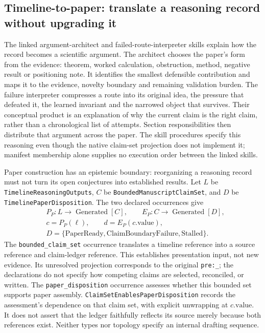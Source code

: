 

\subsection{Timeline-to-paper: translate a reasoning record without upgrading it}
\label{app:granular-timeline-paper-independent-workflow}
The linked argument-architect and failed-route-interpreter skills explain how
the record becomes a scientific argument. The architect chooses the paper's form
from the evidence: theorem, worked calculation, obstruction, method, negative
result or positioning note. It identifies the smallest defensible contribution
and maps it to the evidence, novelty boundary and remaining validation burden.
The failure interpreter compresses a route into its original idea, the pressure
that defeated it, the learned invariant and the narrowed object that survives.
Their conceptual product is an explanation of why the current claim is the right
claim, rather than a chronological list of attempts. Section responsibilities
then distribute that argument across the paper. The skill procedures specify this
reasoning even though the native claim-set projection does not implement it;
manifest membership alone supplies no execution order between the linked skills.

Paper construction has an epistemic boundary: reorganizing a reasoning record
must not turn its open conjectures into established results. Let $L$ be
\texttt{Timeline\allowbreak Reasoning\allowbreak Outputs}, $C$ be
\texttt{Bounded\allowbreak Manuscript\allowbreak Claim\allowbreak Set}, and $D$ be
\texttt{Timeline\allowbreak Paper\allowbreak Disposition}. The two declared occurrences give
\[
\begin{aligned}
&P_P:L\to\operatorname{Generated}[C],\qquad
 E_P:C\to\operatorname{Generated}[D],\\
&c=P_P(\ell),\qquad d=E_P(c.\mathrm{value}),\\
&D=\{\mathrm{PaperReady},\mathrm{ClaimBoundaryFailure},\mathrm{Stalled}\}.
\end{aligned}
\]
The \texttt{bounded\_\allowbreak claim\_\allowbreak set} occurrence translates a timeline reference into
a source reference and claim-ledger reference. This establishes presentation
input, not new evidence. Its unresolved projection corresponds to the original
\texttt{pre:\_\allowbreak }; the declarations do not specify how competing claims are
selected, reconciled, or written. The \texttt{paper\_\allowbreak disposition} occurrence
assesses whether this bounded set supports paper assembly.
\texttt{Claim\allowbreak Set\allowbreak Enables\allowbreak Paper\allowbreak Disposition} records the assessment's dependence on
that claim set, with explicit unwrapping at $c.\mathrm{value}$. It does not assert
that the ledger faithfully reflects its source merely because both references
exist. Neither types nor topology specify an internal drafting sequence.


